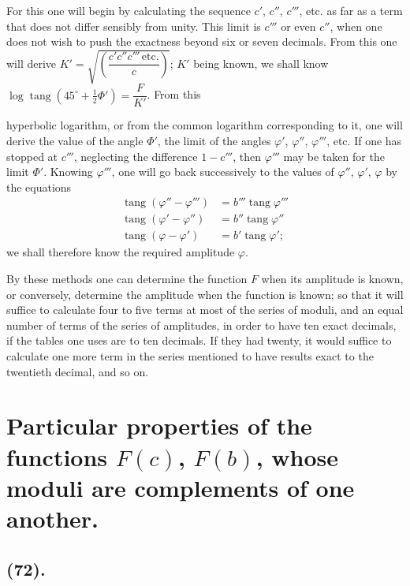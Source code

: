 \documentclass{article}
\begin{document}
For this one will begin by calculating the sequence $c'$, $c''$, $c'''$, etc. as far as a term that does not differ sensibly from unity. This limit is $c'''$ or even $c''$, when one does not wish to push the exactness beyond six or seven decimals. From this one will derive $K'=\sqrt{\left(\dfrac{c'c''c'''\,\text{etc.}}{c}\right)}$; $K'$ being known, we shall know $\log\operatorname{tang}(45^{\circ}+\frac{1}{2}\Phi')=\dfrac{F}{K'}$. From this

hyperbolic logarithm, or from the common logarithm corresponding to it, one will derive the value of the angle $\Phi'$, the limit of the angles $\varphi'$, $\varphi''$, $\varphi'''$, etc. If one has stopped at $c'''$, neglecting the difference $1-c'''$, then $\varphi'''$ may be taken for the limit $\Phi'$. Knowing $\varphi'''$, one will go back successively to the values of $\varphi''$, $\varphi'$, $\varphi$ by the equations
\[ \begin{aligned} \operatorname{tang}(\varphi''-\varphi''')&=b'''\operatorname{tang}\varphi'''\\ \operatorname{tang}(\varphi'-\varphi'')&=b''\operatorname{tang}\varphi''\\ \operatorname{tang}(\varphi-\varphi')&=b'\operatorname{tang}\varphi'; \end{aligned} \]
we shall therefore know the required amplitude $\varphi$.

By these methods one can determine the function $F$ when its amplitude is known, or conversely, determine the amplitude when the function is known; so that it will suffice to calculate four to five terms at most of the series of moduli, and an equal number of terms of the series of amplitudes, in order to have ten exact decimals, if the tables one uses are to ten decimals. If they had twenty, it would suffice to calculate one more term in the series mentioned to have results exact to the twentieth decimal, and so on.

\section*{Particular properties of the functions $F(c)$, $F(b)$, whose moduli are complements of one another.}

\subsection*{(72).}
\end{document}
